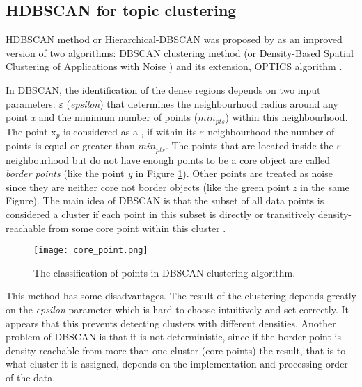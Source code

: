 \documentclass[fontsize=12pt,a4paper,twoside,openany]{scrbook}
\begin{document}
\subsection{HDBSCAN for topic clustering}
\label{sec:HDBSCAN}

HDBSCAN method or Hierarchical-DBSCAN was proposed by \parencite{Campello13, Campello15} as an improved version of two algorithms: DBSCAN clustering method (or Density-Based Spatial Clustering of Applications with Noise \parencite{Ester96}) and its extension, OPTICS algorithm \parencite{Ankerst99}.

In DBSCAN, the identification of the dense regions depends on two input parameters:  \(\varepsilon\) (\emph{epsilon}) that determines the neighbourhood radius around any point \emph{x} and the minimum number of points (\(min_{pts}\)) within this neighbourhood. The point x\(_p\) is considered as a  \parencite{Campello13}, if within its \(\varepsilon\)-neighbourhood the number of points is equal or greater than \(min_{pts}\). The points that are located inside the \(\varepsilon\)-neighbourhood but do not have enough points to be a core object are called \emph{border points} (like the point \emph{y} in Figure \ref{fig:core_point}). Other points are treated as noise since they are neither core not border objects (like the green point \emph{z} in the same Figure). The main idea of DBSCAN is that the subset of all data points is considered a cluster if each point in this subset is directly or transitively density-reachable from some core point within this cluster \parencite{Ester96}.

\begin{figure}[h]
\centering
\texttt{[image: core\_point.png]}
\caption{The classification of points in DBSCAN clustering algorithm.}
\label{fig:core_point}
\end{figure}

This method has some disadvantages. The result of the clustering depends greatly on the \emph{epsilon} parameter which is hard to choose intuitively and set correctly. It appears that this  \parencite{Malzer20} prevents detecting clusters with different densities. Another problem of DBSCAN is that it is not deterministic, since if the border point is density-reachable from more than one cluster (core points) the result, that is to what cluster it is assigned, depends on the implementation and processing order of the data. 
\end{document}

